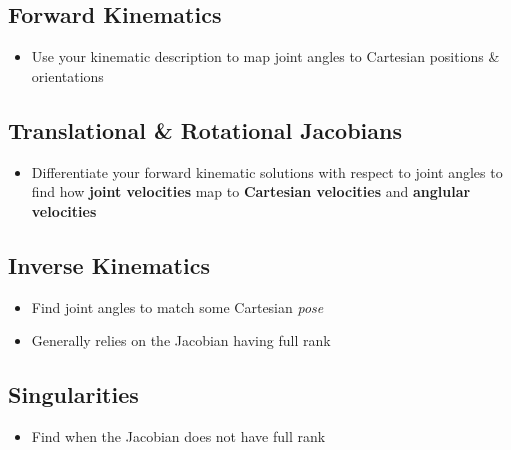 \documentclass[
  letterpaper,
  DIV=11,
  numbers=noendperiod]{scrreprt}
\providecommand{\tightlist}{%
  \setlength{\itemsep}{0pt}\setlength{\parskip}{0pt}}\usepackage{longtable,booktabs,array}
\begin{document}
\hypertarget{forward-kinematics}{%
\subsection*{Forward Kinematics}\label{forward-kinematics}}

\begin{itemize}
\tightlist
\item
  Use your kinematic description to map joint angles to Cartesian
  positions \& orientations
\end{itemize}

\hypertarget{translational-rotational-jacobians}{%
\subsection*{Translational \& Rotational
Jacobians}\label{translational-rotational-jacobians}}

\begin{itemize}
\tightlist
\item
  Differentiate your forward kinematic solutions with respect to joint
  angles to find how \textbf{joint velocities} map to \textbf{Cartesian
  velocities} and \textbf{anglular velocities}
\end{itemize}

\hypertarget{inverse-kinematics}{%
\subsection*{Inverse Kinematics}\label{inverse-kinematics}}

\begin{itemize}
\tightlist
\item
  Find joint angles to match some Cartesian \emph{pose}
\item
  Generally relies on the Jacobian having full rank
\end{itemize}

\hypertarget{singularities}{%
\subsection*{Singularities}\label{singularities}}

\begin{itemize}
\tightlist
\item
  Find when the Jacobian does not have full rank
\end{itemize}
\end{document}

